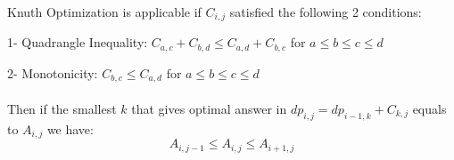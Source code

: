 Knuth Optimization is applicable if $C_{i,j}$ satisfied the following 2 conditions:

1- Quadrangle Inequality: $C_{a,c} + C_{b,d} \leq C_{a,d} + C_{b,c}$ for $a \leq b \leq c \leq d$

2- Monotonicity: $C_{b,c} \leq C_{a,d}$ for $a \leq b \leq c \leq d$
\\
\\
Then if the smallest $k$ that gives optimal answer in $dp_{i,j} = dp_{i-1,k} + C_{k,j}$ equals to $A_{i,j}$ we have:
$$A_{i,j-1} \leq A_{i,j} \leq A_{i+1,j}$$
